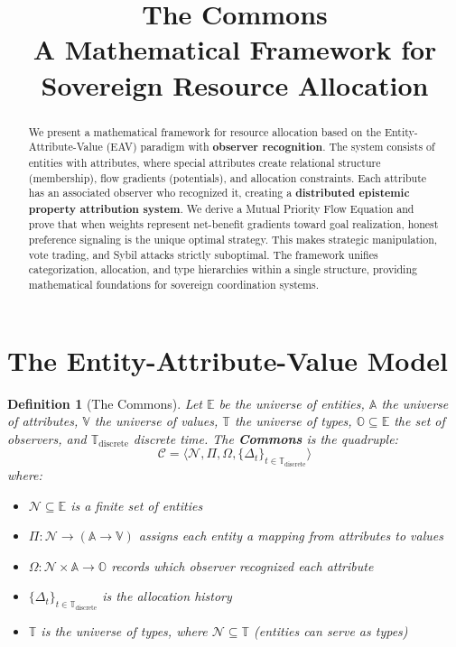 \documentclass[11pt]{article}
\title{\textbf{The Commons}\\
\large A Mathematical Framework for Sovereign Resource Allocation}
\author{}
\date{}
\newtheorem{definition}{Definition}
\begin{document}
\maketitle

\begin{abstract}
We present a mathematical framework for resource allocation based on the Entity-Attribute-Value (EAV) paradigm with \textbf{observer recognition}. The system consists of entities with attributes, where special attributes create relational structure (membership), flow gradients (potentials), and allocation constraints. Each attribute has an associated observer who recognized it, creating a \textbf{distributed epistemic property attribution system}. We derive a Mutual Priority Flow Equation and prove that when weights represent net-benefit gradients toward goal realization, honest preference signaling is the unique optimal strategy. This makes strategic manipulation, vote trading, and Sybil attacks strictly suboptimal. The framework unifies categorization, allocation, and type hierarchies within a single structure, providing mathematical foundations for sovereign coordination systems.
\end{abstract}

\section{The Entity-Attribute-Value Model}

\begin{definition}[The Commons]
Let $\mathbb{E}$ be the universe of entities, $\mathbb{A}$ the universe of attributes, $\mathbb{V}$ the universe of values, $\mathbb{T}$ the universe of types, $\mathbb{O} \subseteq \mathbb{E}$ the set of observers, and $\mathbb{T}_{\text{discrete}}$ discrete time. The \textbf{Commons} is the quadruple:
\[
\mathcal{C} = \langle \mathcal{N}, \Pi, \Omega, \{\Delta_t\}_{t \in \mathbb{T}_{\text{discrete}}} \rangle
\]
where:
\begin{itemize}
\item $\mathcal{N} \subseteq \mathbb{E}$ is a finite set of entities
\item $\Pi: \mathcal{N} \to (\mathbb{A} \to \mathbb{V})$ assigns each entity a mapping from attributes to values
\item $\Omega: \mathcal{N} \times \mathbb{A} \to \mathbb{O}$ records which observer recognized each attribute
\item $\{\Delta_t\}_{t \in \mathbb{T}_{\text{discrete}}}$ is the allocation history
\item $\mathbb{T}$ is the universe of types, where $\mathcal{N} \subseteq \mathbb{T}$ (entities can serve as types)
\end{itemize}
\end{definition}
\end{document}
